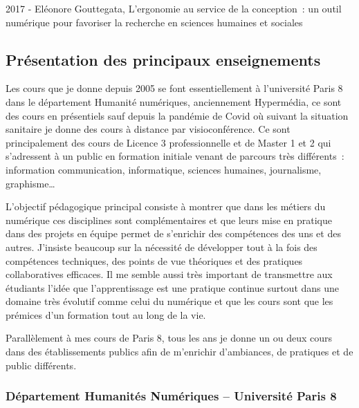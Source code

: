 \documentclass[
  a4paper,
  DIV=11,
  numbers=noendperiod]{scrreprt}
\begin{document}
2017 - Eléonore Gouttegata, L'ergonomie au service de la conception~: un
outil numérique pour favoriser la recherche en sciences humaines et
sociales

\subsection{Présentation des principaux
enseignements}\label{pruxe9sentation-des-principaux-enseignements}

Les cours que je donne depuis 2005 se font essentiellement à
l'université Paris 8 dans le département Humanité numériques,
anciennement Hypermédia, ce sont des cours en présentiels sauf depuis la
pandémie de Covid où suivant la situation sanitaire je donne des cours à
distance par visioconférence. Ce sont principalement des cours de
Licence 3 professionnelle et de Master 1 et 2 qui s'adressent à un
public en formation initiale venant de parcours très différents~:
information communication, informatique, sciences humaines, journalisme,
graphisme\ldots{}

L'objectif pédagogique principal consiste à montrer que dans les métiers
du numérique ces disciplines sont complémentaires et que leurs mise en
pratique dans des projets en équipe permet de s'enrichir des compétences
des uns et des autres. J'insiste beaucoup sur la nécessité de développer
tout à la fois des compétences techniques, des points de vue théoriques
et des pratiques collaboratives efficaces. Il me semble aussi très
important de transmettre aux étudiants l'idée que l'apprentissage est
une pratique continue surtout dans une domaine très évolutif comme celui
du numérique et que les cours sont que les prémices d'un formation tout
au long de la vie.

Parallèlement à mes cours de Paris 8, tous les ans je donne un ou deux
cours dans des établissements publics afin de m'enrichir d'ambiances, de
pratiques et de public différents.

\subsubsection{\texorpdfstring{\textbf{Département Humanités Numériques
-- Université Paris
8}}{Département Humanités Numériques -- Université Paris 8}}\label{duxe9partement-humanituxe9s-numuxe9riques-universituxe9-paris-8}
\end{document}
